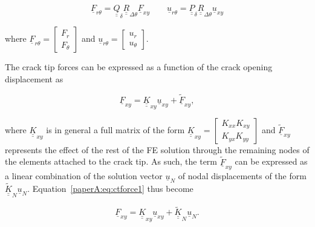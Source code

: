 \begin{equation}\label{paperA:eq:FUrot}
\underline{F}_{r\theta}=\underline{\underline{Q}}_{\delta}\underline{\underline{R}}_{\Delta\theta}\underline{F}_{xy}\qquad\underline{u}_{r\theta}=\underline{\underline{P}}_{\delta}\underline{\underline{R}}_{\Delta\theta}\underline{u}_{xy}
\end{equation}

where $\underline{F}_{r\theta}=\begin{bmatrix}
F_{r} \\
F_{\theta}
\end{bmatrix}$ and $\underline{u}_{r\theta}=\begin{bmatrix}
u_{r} \\
u_{\theta}
\end{bmatrix}$.

The crack tip forces can be expressed as a function of the crack opening displacement as

\begin{equation}\label{paperA:eq:ctforce1}
\underline{F}_{xy}=\underline{\underline{K}}_{xy}\underline{u}_{xy}+\underline{\widetilde{F}}_{xy},
\end{equation}

where $\underline{\underline{K}}_{xy}$ is in general a full matrix of the form $\underline{\underline{K}}_{xy}=\begin{bmatrix}
K_{xx}  K_{xy}\\
K_{yx}  K_{yy}
\end{bmatrix}$ and $\underline{\widetilde{F}}_{xy}$ represents the effect of the rest of the FE solution through the remaining nodes of the elements attached to the crack tip. As such, the term $\underline{\widetilde{F}}_{xy}$ can be expressed as a linear combination of the solution vector $\underline{u}_{N}$ of nodal displacements of the form $\underline{\underline{\widetilde{K}}}_{N}\underline{u}_{N}$. Equation~\ref{paperA:eq:ctforce1} thus become

\begin{equation}\label{paperA:eq:ctforce2}
\underline{F}_{xy}=\underline{\underline{K}}_{xy}\underline{u}_{xy}+\underline{\underline{\widetilde{K}}}_{N}\underline{u}_{N}.
\end{equation}


